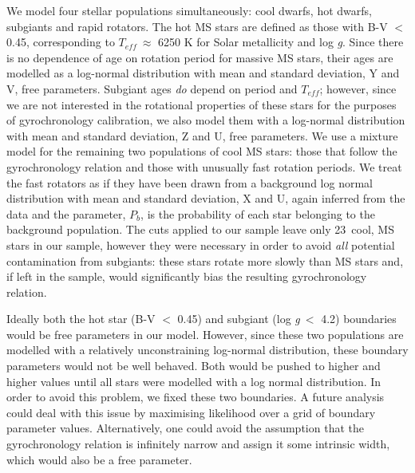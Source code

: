 \documentclass[10pt,preprint]{aastex}
\newcommand{\logg}{log \emph{g}}
\newcommand{\teff}{$T_{eff}$}
\newcommand{\ncooldwarfs}{23~}
\begin{document}
We model four stellar populations simultaneously: cool dwarfs, hot dwarfs, subgiants and rapid rotators.
The hot MS stars are defined as those with B-V $<$ 0.45, corresponding to \teff$~\approx$ 6250 K for Solar metallicity and \logg.
Since there is no dependence of age on rotation period for massive MS stars, their ages are modelled as a log-normal distribution with mean and standard deviation, Y and V, free parameters.
Subgiant ages \emph{do} depend on period and $T_{eff}$; however, since we are not interested in the rotational properties of these stars for the purposes of gyrochronology calibration, we also model them with a log-normal distribution with mean and standard deviation, Z and U, free parameters.
We use a mixture model for the remaining two populations of cool MS stars: those that follow the gyrochronology relation and those with unusually fast rotation periods.
We treat the fast rotators as if they have been drawn from a background log normal distribution with mean and standard deviation, X and U, again inferred from the data and the parameter, $P_b$, is the probability of each star belonging to the background population.
The cuts applied to our sample leave only \ncooldwarfs cool, MS stars in our sample, however they were necessary in order to avoid {\it all} potential contamination from subgiants: these stars rotate more slowly than MS stars and, if left in the sample, would significantly bias the resulting gyrochronology relation.

Ideally both the hot star (B-V $<$ 0.45) and subgiant (\logg$~<$ 4.2) boundaries would be free parameters in our model.
However, since these two populations are modelled with a relatively unconstraining log-normal distribution, these boundary parameters would not be well behaved.
Both would be pushed to higher and higher values until all stars were modelled with a log normal distribution.
In order to avoid this problem, we fixed these two boundaries.
A future analysis could deal with this issue by maximising likelihood over a grid of boundary parameter values.
Alternatively, one could avoid the assumption that the gyrochronology relation is infinitely narrow and assign it some intrinsic width, which would also be a free parameter.
\end{document}
